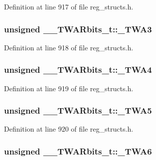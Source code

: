 Definition at line 917 of file reg\+\_\+structs.\+h.

\hypertarget{union_____t_w_a_rbits__t_a9185f927b078d32acde9602189659714}{
\subsubsection[{\+\_\+\+T\+W\+A3}]{\setlength{\rightskip}{0pt plus 5cm}unsigned \+\_\+\+\_\+\+T\+W\+A\+Rbits\+\_\+t\+::\+\_\+\+T\+W\+A3}}\label{union_____t_w_a_rbits__t_a9185f927b078d32acde9602189659714}


Definition at line 918 of file reg\+\_\+structs.\+h.

\hypertarget{union_____t_w_a_rbits__t_a061ed073789b2a81c9bde34c252fe8b9}{
\subsubsection[{\+\_\+\+T\+W\+A4}]{\setlength{\rightskip}{0pt plus 5cm}unsigned \+\_\+\+\_\+\+T\+W\+A\+Rbits\+\_\+t\+::\+\_\+\+T\+W\+A4}}\label{union_____t_w_a_rbits__t_a061ed073789b2a81c9bde34c252fe8b9}


Definition at line 919 of file reg\+\_\+structs.\+h.

\hypertarget{union_____t_w_a_rbits__t_abc4ba1e62c3976eff8e834f29a1c8a12}{
\subsubsection[{\+\_\+\+T\+W\+A5}]{\setlength{\rightskip}{0pt plus 5cm}unsigned \+\_\+\+\_\+\+T\+W\+A\+Rbits\+\_\+t\+::\+\_\+\+T\+W\+A5}}\label{union_____t_w_a_rbits__t_abc4ba1e62c3976eff8e834f29a1c8a12}


Definition at line 920 of file reg\+\_\+structs.\+h.

\hypertarget{union_____t_w_a_rbits__t_a16f85f6b34909395008a809848d73575}{
\subsubsection[{\+\_\+\+T\+W\+A6}]{\setlength{\rightskip}{0pt plus 5cm}unsigned \+\_\+\+\_\+\+T\+W\+A\+Rbits\+\_\+t\+::\+\_\+\+T\+W\+A6}}\label{union_____t_w_a_rbits__t_a16f85f6b34909395008a809848d73575}


